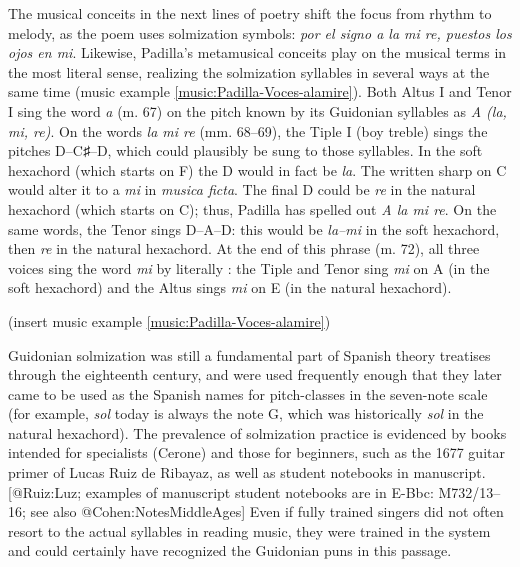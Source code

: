 The musical conceits in the next lines of poetry shift the focus from rhythm to
melody, as the poem uses solmization symbols: \emph{por el signo a la mi re, puestos
los ojos en mi}.
Likewise, Padilla's metamusical conceits play on the musical terms in the most
literal sense, realizing the solmization syllables in several ways at the same
time (music example \ref{music:Padilla-Voces-alamire}).
Both Altus I and Tenor I sing the word \emph{a} (m. 67) on the pitch known by its
Guidonian syllables as \emph{A (la, mi, re)}.
On the words \emph{la mi re} (mm. 68--69), the Tiple I (boy treble) sings the
pitches D--C♯--D, which could plausibly be sung to those syllables.
In the soft hexachord (which starts on F) the D would in fact be \emph{la}.
The written sharp on C would alter it to a \emph{mi} in \emph{musica ficta}. 
The final D could be \emph{re} in the natural hexachord (which starts on C); thus,
Padilla has spelled out \emph{A la mi re}.
On the same words, the Tenor sings D--A--D: this would be \emph{la--mi} in the soft
hexachord, then \emph{re} in the natural hexachord.
At the end of this phrase (m. 72), all three voices sing the word \emph{mi} by
literally : the Tiple and Tenor sing \emph{mi} on A (in
the soft hexachord) and the Altus sings \emph{mi} on E (in the natural hexachord).

(insert music example \ref{music:Padilla-Voces-alamire})
\label{music:Padilla-Voces-alamire}

Guidonian solmization was still a fundamental part of Spanish theory treatises
through the eighteenth century, and were used frequently enough that they later
came to be used as the Spanish names for pitch-classes in the seven-note scale
(for example, \emph{sol} today is always the note G, which was historically \emph{sol} in
the natural hexachord).
The prevalence of solmization practice is evidenced by books intended for
specialists (Cerone) and those for beginners, such as the 1677 guitar primer of
Lucas Ruiz de Ribayaz, as well as student notebooks in manuscript.
[@Ruiz:Luz; examples of manuscript student notebooks are in E-Bbc: M732/13--16;
see also @Cohen:NotesMiddleAges]
Even if fully trained singers did not often resort to the actual syllables in
reading music, they were trained in the system and could certainly have
recognized the Guidonian puns in this passage.


